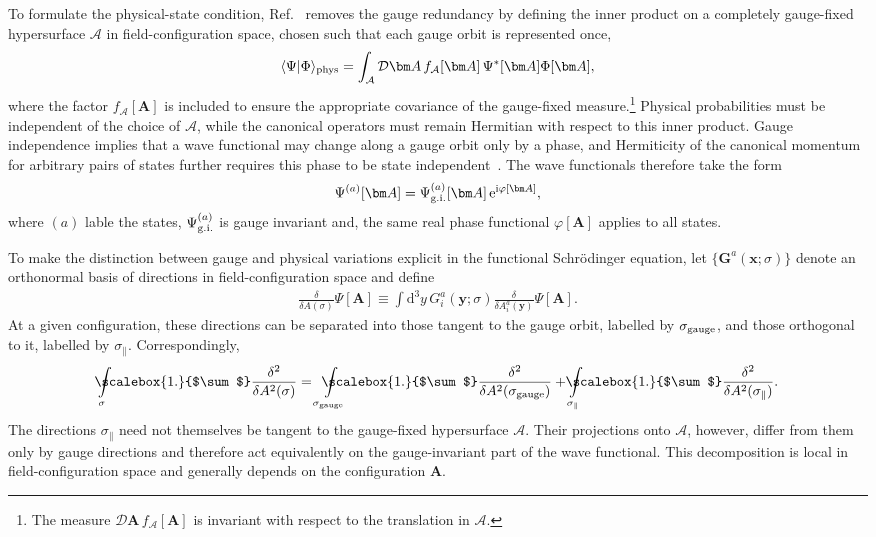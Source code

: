 \documentclass[review]{elsarticle}
\numberwithin{equation}{section}
\numberwithin{table}{section}
\numberwithin{figure}{section}
\def\d{\mathrm{d}}
\def\i{\mathrm{i}}
\def\e{\mathrm{e}}
\begin{document}
To formulate the physical-state condition, Ref.~\cite{Ai:2024vfa} removes the gauge redundancy by defining the inner product on a completely gauge-fixed hypersurface $\mathcal A$ in field-configuration space, chosen such that each gauge orbit is represented once,
\begin{align}
    \langle\Psi|\Phi\rangle_{\rm phys}
    =
    \int_{\mathcal A}
    \mathcal D\bm A\,
    f_{\mathcal A}[\bm A]\,
    \Psi^*[\bm A]\Phi[\bm A],
    \label{eq:physical-gauge-fixed-inner-product}
\end{align}
where the factor $f_{\mathcal A}[\bm A]$ is included to ensure the appropriate covariance of the gauge-fixed measure.\footnote{The measure $\mathcal D\bm A\,f_{\mathcal A}[\bm A]$ is invariant with respect to the translation in $\mathcal A$.} Physical probabilities must be independent of the choice of $\mathcal A$, while the canonical operators must remain Hermitian with respect to this inner product. Gauge independence implies that a wave functional may change along a gauge orbit only by a phase, and Hermiticity of the canonical momentum for arbitrary pairs of states further requires this phase to be state independent~\cite{Ai:2024vfa}. The wave functionals therefore take the form
\begin{align}
    \Psi^{(a)}[\bm A]
    =
    \Psi_{\rm g.i.}^{(a)}[\bm A]\,
    \e^{\i\varphi[\bm A]},
    \label{product:function:phase}
\end{align}
where $(a)$ lable the states, $\Psi_{\rm g.i.}^{(a)}$ is gauge invariant and, the same real phase functional $\varphi[\bm A]$ applies to all states.

To make the distinction between gauge and physical variations explicit in the functional Schr\"odinger equation, let $\{{\bm G}^a(\bm x;\sigma)\}$ denote an orthonormal basis of directions in field-configuration space and define
\begin{align}
    \frac{\delta}{\delta A(\sigma)}
    \Psi[\bm A]
    \equiv
    \int\d^3y\,
    G_i^a(\bm y;\sigma)
    \frac{\delta}{\delta A_i^a(\bm y)}
    \Psi[\bm A].
    \label{eq:configuration-direction-derivative}
\end{align}
At a given configuration, these directions can be separated into those tangent to the gauge orbit, labelled by $\sigma_{\rm gauge}$, and those orthogonal to it, labelled by $\sigma_\parallel$. Correspondingly,
\begin{align}
    \int\limits_\sigma\hskip-.5cm\scalebox{1.}{$\sum$}
    \frac{\delta^2}{\delta A^2(\sigma)}
    =
    \int\limits_{\sigma_{\rm gauge}}\hskip-.7cm\scalebox{1.}{$\sum$}
    \frac{\delta^2}{\delta A^2(\sigma_{\rm gauge})}
    +
    \int\limits_{\sigma_\parallel}\hskip-.5cm\scalebox{1.}{$\sum$}
    \frac{\delta^2}{\delta A^2(\sigma_\parallel)}.
    \label{eq:configuration-direction-decomposition}
\end{align}
The directions $\sigma_\parallel$ need not themselves be tangent to the gauge-fixed hypersurface $\mathcal A$. Their projections onto $\mathcal A$, however, differ from them only by gauge directions and therefore act equivalently on the gauge-invariant part of the wave functional. This decomposition is local in field-configuration space and generally depends on the configuration $\bm A$.
\end{document}
